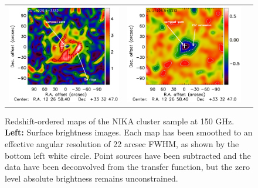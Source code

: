 \documentclass[twocolumn,traditabstract]{aa}
\begin{document}
\begin{figure}[p]
{\begin{tabular}{lll}
\includegraphics[trim=2.3cm 0.7cm 0cm 0cm, clip=true, scale=1]{Figure/Grad_CLJ1227_15_15_45.pdf} & 
\includegraphics[trim=2.3cm 0.7cm 0cm 0cm, clip=true, scale=1]{Figure/DoG_CLJ1227_15_15_45.pdf}
\end{tabular}}
\caption{\footnotesize{Redshift-ordered maps of the NIKA cluster sample at 150 GHz. 
{\bf Left:} Surface brightness images. Each map has been smoothed to an effective angular resolution of 22 arcsec FWHM, as shown by the bottom left white circle. Point sources have been subtracted and the data have been deconvolved from the transfer function, but the zero level absolute brightness remains unconstrained. 
}}
\end{figure}
\end{document}
